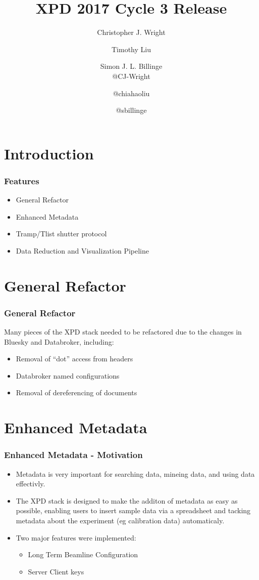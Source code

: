 \documentclass{beamer}
\title{XPD 2017 Cycle 3 Release}
\author{Christopher J. Wright
\and Timothy Liu
\and Simon J. L. Billinge \\
@CJ-Wright
\and @chiahaoliu
\and @sbillinge
}
\begin{document}
\frame{\titlepage}

\section{Introduction}
\begin{frame}
\frametitle{Features}
\begin{itemize}
\item General Refactor
\item Enhanced Metadata
\item Tramp/Tlist shutter protocol
\item Data Reduction and Visualization Pipeline
\end{itemize}
\end{frame}

\section{General Refactor}
\begin{frame}
\frametitle{General Refactor}
Many pieces of the XPD stack needed to be refactored due to the changes in
Bluesky and Databroker, including:
\begin{itemize}
\item Removal of ``dot'' access from headers
\item Databroker named configurations
\item Removal of dereferencing of documents
\end{itemize}
\end{frame}

\section{Enhanced Metadata}
\begin{frame}
\frametitle{Enhanced Metadata - Motivation}
\begin{itemize}
\item Metadata is very important for searching data, mineing data, and using data
effectivly.

\item The XPD stack is designed to make the additon of metadata as easy as possible,
enabling users to insert sample data via a spreadsheet and tacking metadata
about the experiment (eg calibration data) automaticaly.

\item Two major features were implemented:
\begin{itemize}
\item Long Term Beamline Configuration
\item Server Client keys
\end{itemize}
\end{itemize}
\end{frame}
\end{document}
